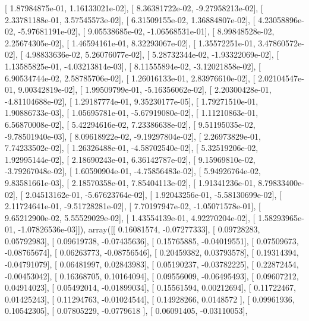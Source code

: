 \documentclass{article}
\begin{document}
       [  1.87984875e-01,   1.16133021e-02],
       [  8.36381722e-02,  -9.27958213e-02],
       [  2.33781188e-01,   3.57545573e-02],
       [  6.31509155e-02,   1.36884807e-02],
       [  4.23058896e-02,  -5.97681191e-02],
       [  9.05538685e-02,  -1.06568531e-01],
       [  8.99848528e-02,   2.25674305e-02],
       [  1.46594161e-01,   8.32293067e-02],
       [  1.35572251e-01,   3.47860572e-02],
       [  4.98833636e-02,   5.26076077e-02],
       [  5.28732344e-02,  -1.93322069e-02],
       [  1.13585825e-01,  -4.03213814e-03],
       [  8.11555894e-02,  -3.12021858e-02],
       [  6.90534744e-02,   2.58785706e-02],
       [  1.26016133e-01,   2.83976610e-02],
       [  2.02104547e-01,   9.00342819e-02],
       [  1.99509799e-01,  -5.16356062e-02],
       [  2.20300428e-01,  -4.81104688e-02],
       [  1.29187774e-01,   9.35230177e-05],
       [  1.79271510e-01,   1.90886733e-03],
       [  1.05695781e-01,  -5.67919080e-02],
       [  1.11210863e-01,   6.56870008e-02],
       [  5.42294616e-02,   7.23386638e-02],
       [  9.51195035e-02,  -9.78501940e-03],
       [  8.09618922e-02,  -9.19297804e-02],
       [  2.26973829e-01,   7.74233502e-02],
       [  1.26326488e-01,  -4.58702540e-02],
       [  5.32519206e-02,   1.92995144e-02],
       [  2.18690243e-01,   6.36142787e-02],
       [  9.15969810e-02,  -3.79267048e-02],
       [  1.60590904e-01,  -4.75856483e-02],
       [  5.94926764e-02,   9.83581661e-03],
       [  2.18570358e-01,   7.85404113e-02],
       [  1.91341236e-01,   8.79833400e-02],
       [  2.04513162e-01,  -5.67623764e-02],
       [  1.92043256e-01,  -5.58130699e-02],
       [  2.11724641e-01,  -9.51728281e-02],
       [  7.70197947e-02,  -1.05071578e-01],
       [  9.65212900e-02,   5.55529029e-02],
       [  1.43554139e-01,   4.92270204e-02],
       [  1.58293965e-01,  -1.07826536e-03]]), array([[ 0.16081574, -0.07277333],
       [ 0.09728283,  0.05792983],
       [ 0.09619738, -0.07435636],
       [ 0.15765885, -0.04019551],
       [ 0.07509673, -0.08765674],
       [ 0.06263773, -0.08756546],
       [ 0.20459382,  0.03793578],
       [ 0.19314394, -0.04791079],
       [ 0.06481997,  0.02843983],
       [ 0.05190237, -0.03782225],
       [ 0.22872454, -0.00453042],
       [ 0.16368705,  0.10164094],
       [ 0.09556009, -0.06495493],
       [ 0.09607212,  0.04914023],
       [ 0.05492014, -0.01899034],
       [ 0.15561594,  0.00212694],
       [ 0.11722467,  0.01425243],
       [ 0.11294763, -0.01024544],
       [ 0.14928266,  0.0148572 ],
       [ 0.09961936,  0.10542305],
       [ 0.07805229, -0.0779618 ],
       [ 0.06091405, -0.03110053],
\end{document}
